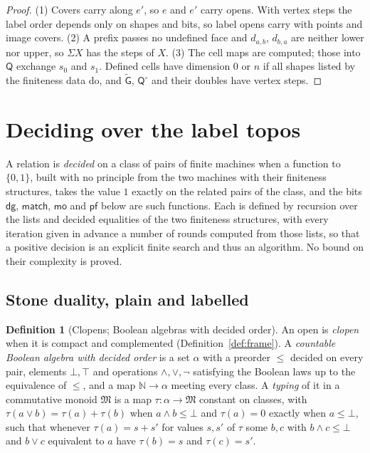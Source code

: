 \documentclass{lmcs}
\theoremstyle{definition}
\newtheorem{definition}[theorem]{Definition}
\theoremstyle{remark}
\newcommand{\Nn}{\mathbb{N}}
\providecommand{\dgB}{\mathsf{dg}}
\providecommand{\matchB}{\mathsf{match}}
\providecommand{\moB}{\mathsf{mo}}
\providecommand{\wQ}{\mathsf{Q}}
\providecommand{\pfB}{\mathsf{pf}}
\providecommand{\wGt}{\tilde{\mathsf{G}}}
\providecommand{\wQ}{\mathsf{Q}}
\begin{document}
\begin{proof}
(1) Covers carry along $e'$, so $e$ and $e'$ carry opens.
With vertex steps the label order depends only on shapes and bits, so label opens carry with points and
image covers.
(2) A prefix passes no undefined face and $d_{a,b}$, $d_{b,a}$ are neither lower nor upper, so $\Sigma X$ has
the steps of $X$.
(3) The cell maps are computed; those into $\wQ$ exchange $s_0$ and $s_1$.
Defined cells have dimension $0$ or $n$ if all shapes listed by the finiteness data do, and $\wGt$,
$\wQ^\circ$ and their doubles have vertex steps.
\end{proof}
\section{Deciding over the label topos}\label{sec:decide}

A relation is \emph{decided} on a class of pairs of finite machines when a function to $\{0,1\}$, built with no
principle from the two machines with their finiteness structures, takes the value $1$ exactly on the related pairs of
the class, and the bits $\dgB$, $\matchB$, $\moB$ and $\pfB$ below are such functions. Each is defined by recursion
over the lists and decided equalities of the two finiteness structures, with every iteration given in advance a number
of rounds computed from those lists, so that a positive decision is an explicit finite search and thus an
algorithm. No bound on their complexity is
proved.

\subsection{Stone duality, plain and labelled}\label{ssec:decide-stone}

\begin{definition}[Clopens; Boolean algebras with decided order]\label{def:dec-clopen}\label{def:dec-bool-alg}\label{def:dec-bool}
An open is \emph{clopen} when it is compact and complemented (Definition~\ref{def:frame}). A \emph{countable Boolean algebra with decided order} is a
set $\alpha$ with a preorder $\leq$ decided on every pair, elements $\bot,\top$ and operations $\wedge,\vee,\neg$
satisfying the Boolean laws up to the equivalence of $\leq$, and a map $\Nn\to\alpha$ meeting every class. A
\emph{typing} of it in a commutative monoid $\mathfrak M$ is a map $\tau\colon\alpha\to\mathfrak M$ constant on classes, with
$\tau(a\vee b)=\tau(a)+\tau(b)$ when $a\wedge b\leq\bot$ and $\tau(a)=0$ exactly when $a\leq\bot$, such that whenever
$\tau(a)=s+s'$ for values $s,s'$ of $\tau$ some $b,c$ with $b\wedge c\leq\bot$ and $b\vee c$ equivalent to $a$ have
$\tau(b)=s$ and $\tau(c)=s'$.
\end{definition}
\end{document}

